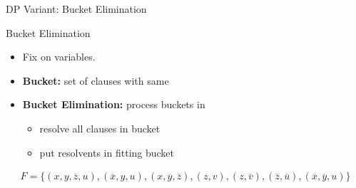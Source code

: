 \documentclass[t]{sdqbeamer}
\begin{document}
\begin{frame}{DP Variant: Bucket Elimination}
	
	\vspace*{-1.5em}
	\begin{block}{Bucket Elimination}
		\begin{itemize}
			\item Fix  on variables.
			\item \textbf{Bucket:} set of clauses with same 
			\item \textbf{Bucket Elimination:} process buckets in 
			\begin{itemize}
				\item resolve all clauses in bucket
				\item put resolvents in fitting bucket
			\end{itemize}
		\end{itemize}
	\end{block}
	
	\begin{example}
		\centering
		\begin{minipage}{0.95\textwidth}
			\vspace*{-1ex}
			\begin{align*}
				F = \{ (x, y, \overline z, u ), (\overline x, y, u ), (x, \overline y, \overline z ),
				(z, v), (z, \overline v), (\overline z, \overline u ), (\overline x, \overline y, u) \} \tag{$x \succ y \succ z \succ u \succ v$}
			\end{align*}
			\vspace*{-1.3ex}
			
			\newcommand{\rowspace}{\phantom{(Gg)}}
			

\end{minipage}
\end{example}
\end{frame}
\end{document}

